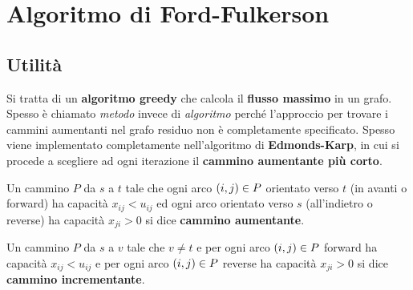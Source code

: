 \documentclass[\main/main.tex]{subfiles}
\begin{document}
\chapter{Algoritmo di Ford-Fulkerson}
\section{Utilità}
Si tratta di un \textbf{algoritmo greedy} che calcola il \textbf{flusso massimo} in un grafo. Spesso è chiamato \textit{metodo} invece di \textit{algoritmo} perché l'approccio per trovare i cammini aumentanti nel grafo residuo non è completamente specificato. Spesso viene implementato completamente nell'algoritmo di \textbf{Edmonds-Karp}, in cui si procede a scegliere ad ogni iterazione il \textbf{cammino aumentante più corto}.

\begin{definition}
  Un cammino \(P\) da \(s\) a \(t\) tale che ogni arco \(\left(i,j\right) \in P\) orientato verso \(t\) (in avanti o forward) ha capacità \(x_{ij}<u_{ij}\) ed ogni arco orientato verso \(s\) (all'indietro o reverse) ha capacità \(x_{ji} > 0\) si dice \textbf{cammino aumentante}.
\end{definition}

\begin{definition}
  Un cammino \(P\) da \(s\) a \(v\) tale che \(v \neq t\) e per ogni arco \(\left(i,j\right) \in P\) forward ha capacità \(x_{ij} < u_{ij}\) e per ogni arco \(\left(i,j\right) \in P\) reverse ha capacità \(x_{ji}>0\) si dice \textbf{cammino incrementante}.
\end{definition}
\clearpage
\end{document}
